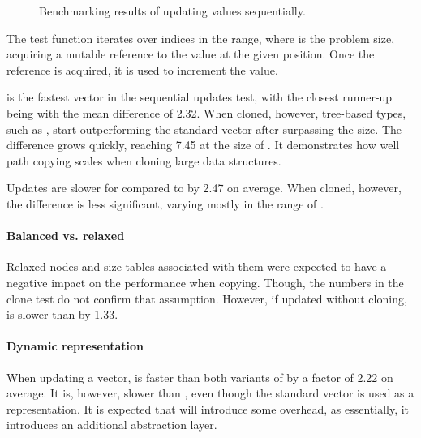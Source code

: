 \begin{figure}[!htbp]
    \caption{Benchmarking results of updating values sequentially.}
    \label{fig:update-sequentially}
\end{figure}

The test function iterates over indices in the \range{[0, N)} range, where \n{} is the problem size, acquiring a mutable reference to the value at the given position. Once the reference is acquired, it is used to increment the value.

\stdvec{} is the fastest vector in the sequential updates test, with the closest runner-up being \pvec{} with the mean difference of 2.32. When cloned, however, tree-based types, such as \rbvec{}, start outperforming the standard vector after surpassing the  size. The difference grows quickly, reaching 7.45 at the size of . It demonstrates how well path copying scales when cloning large data structures.

Updates are slower for \imrsvec{} compared to \rrbvec{} by 2.47 on average. When cloned, however, the difference is less significant, varying mostly in the range of \range{[20, 400]}.

\paragraph{Balanced vs. relaxed}
Relaxed nodes and size tables associated with them were expected to have a negative impact on the performance when copying. Though, the numbers in the clone test do not confirm that assumption. However, if updated without cloning, \rrbvec{} is slower than \rbvec{} by 1.33.

\paragraph{Dynamic representation}
When updating a vector, \pvec{} is faster than both variants of \rbvec{} by a factor of 2.22 on average. It is, however, slower than \stdvec{}, even though the standard vector is used as a representation. It is expected that \pvec{} will introduce some overhead, as essentially, it introduces an additional abstraction layer.

